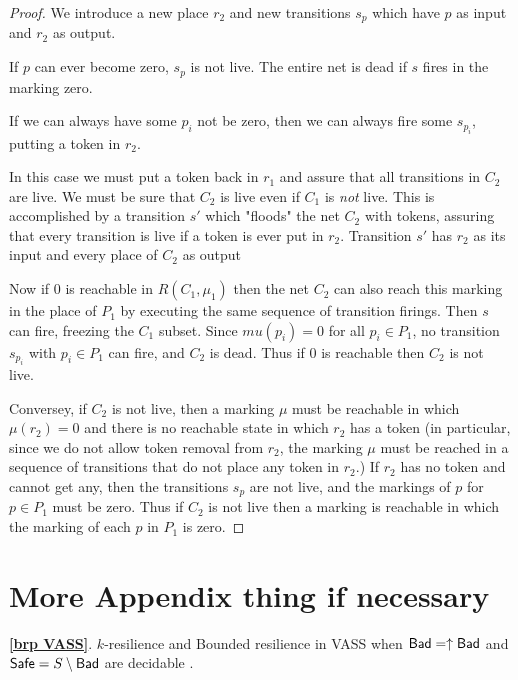 \begin{proof}
We introduce a new place $r_2$ and new transitions $s_p$ which have $p$ as input and $r_2$ as output.

If $p$ can ever become zero, $s_p$ is not live. The entire net is dead if
$s$ fires in the marking zero.

If we can always have some $p_i$ not be zero, then we can always fire some $s_{p_i}$, putting a token in $r_2$.

In this case we must put a token back in $r_1$ and assure that all transitions in $C_2$ are live.
We must be sure that $C_2$ is live even if $C_1$ is {\em not} live.
This is accomplished by a transition $s'$ which  "floods" the net $C_2$ with tokens, assuring that every transition is live if a token is ever put in $r_2$.
Transition $s'$ has $r_2$ as its input and every place of $C_2$ as output

Now if $0$ is reachable
in $R(C_1, \mu_1)$ 
then the net $C_2$ can also reach this marking
in the place of $P_1$ by executing the same sequence of transition firings.
Then $s$ can fire, freezing the $C_1$ subset.
Since $mu(p_i) = 0$ for all $p_i \in P_1$, no transition $s_{p_i}$ with $p_i \in P_1$ can fire, and $C_2$ is dead.
Thus if $0$ is reachable then $C_2$ is not live.

Conversey, if $C_2$ is not live, then a marking $\mu$ must be reachable in which 
$\mu(r_2) = 0$ and there is no reachable state in which $r_2$ has a token
(in particular, since we do not allow token removal from $r_2$, the marking $\mu$ must be reached in a sequence of transitions that do not place any token in $r_2$.)
If $r_2$ has no token and cannot get any, then the transitions $s_p$ are not live, and the markings of $p$ for $p \in P_1$ must be zero. 
Thus if $C_2$ is not live then a marking is reachable in which the marking of each $p$ in $P_1$ is zero. 

\end{proof}


\section{More Appendix thing if necessary}\label{appendix brp VASS}

\begin{theorem*}{\textbf{\ref{brp VASS}}.}
{\sc $k$-resilience }  and {\sc Bounded resilience} in VASS when $\textsf{Bad} = \uparrow \textsf{Bad}$ and $\textsf{Safe} = S \setminus \textsf{Bad}$ are decidable%
.
\end{theorem*}

